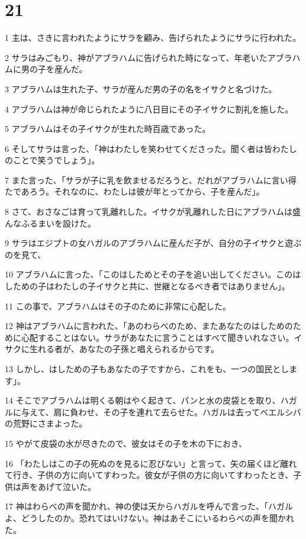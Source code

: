 \chapter{21}

\par 1 主は、さきに言われたようにサラを顧み、告げられたようにサラに行われた。
\par 2 サラはみごもり、神がアブラハムに告げられた時になって、年老いたアブラハムに男の子を産んだ。
\par 3 アブラハムは生れた子、サラが産んだ男の子の名をイサクと名づけた。
\par 4 アブラハムは神が命じられたように八日目にその子イサクに割礼を施した。
\par 5 アブラハムはその子イサクが生れた時百歳であった。
\par 6 そしてサラは言った、「神はわたしを笑わせてくださった。聞く者は皆わたしのことで笑うでしょう」。
\par 7 また言った、「サラが子に乳を飲ませるだろうと、だれがアブラハムに言い得たであろう。それなのに、わたしは彼が年とってから、子を産んだ」。
\par 8 さて、おさなごは育って乳離れした。イサクが乳離れした日にアブラハムは盛んなふるまいを設けた。
\par 9 サラはエジプトの女ハガルのアブラハムに産んだ子が、自分の子イサクと遊ぶのを見て、
\par 10 アブラハムに言った、「このはしためとその子を追い出してください。このはしための子はわたしの子イサクと共に、世継となるべき者ではありません」。
\par 11 この事で、アブラハムはその子のために非常に心配した。
\par 12 神はアブラハムに言われた、「あのわらべのため、またあなたのはしためのために心配することはない。サラがあなたに言うことはすべて聞きいれなさい。イサクに生れる者が、あなたの子孫と唱えられるからです。
\par 13 しかし、はしための子もあなたの子ですから、これをも、一つの国民とします」。
\par 14 そこでアブラハムは明くる朝はやく起きて、パンと水の皮袋とを取り、ハガルに与えて、肩に負わせ、その子を連れて去らせた。ハガルは去ってベエルシバの荒野にさまよった。
\par 15 やがて皮袋の水が尽きたので、彼女はその子を木の下におき、
\par 16 「わたしはこの子の死ぬのを見るに忍びない」と言って、矢の届くほど離れて行き、子供の方に向いてすわった。彼女が子供の方に向いてすわったとき、子供は声をあげて泣いた。
\par 17 神はわらべの声を聞かれ、神の使は天からハガルを呼んで言った、「ハガルよ、どうしたのか。恐れてはいけない。神はあそこにいるわらべの声を聞かれた。
